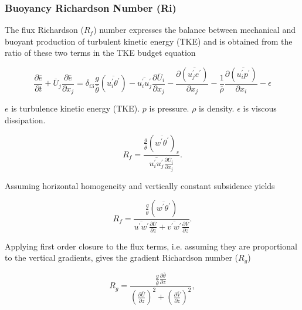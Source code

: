 \subsubsection{Buoyancy Richardson Number (\acs{Ri})}
\label{subsubsec:}

The flux Richardson ($R_{f}$) number expresses the balance between mechanical and buoyant production of turbulent kinetic energy (\acs{TKE}) and is obtained from the ratio of these two terms in the \acs{TKE} budget equation 

\begin{equation}
\frac{\partial \overline{e}}{\partial t} + \overline{U}_{j} \frac{\partial \overline{e}}{\partial x_{j}} = \delta_{i3}  \frac{g}{\overline{\theta}} \left( \overline{u_{i}^{'}\theta^{'}} \right) - \overline{u_{i}^{'}u_{j}^{'}}\frac{\partial \overline{U}_{i}}{\partial x_{j}} - \frac{ \partial \left( \overline{u_{j}^{'}e^{'}} \right)}{\partial x_{j}} - \frac{1}{\overline{\rho}} \frac{\partial \left( \overline{u_{i}^{'} p^{'}} \right) }{\partial x_{i}} - \epsilon
\end{equation}

$e$ is turbulence kinetic energy (TKE).  $p$ is pressure.  $\rho$ is density.  $\epsilon$ is viscous dissipation.

\begin{equation}
R_{f} = \frac{\frac{g}{\overline{\theta}}( \overline{w^{'}\theta^{'}})_{s}}{\overline{u_{i}^{'}u_{j}^{'}}\frac{\partial \overline{U}_{i}}{\partial x_{j}}}.
\end{equation}
 
Assuming horizontal homogeneity and vertically constant subsidence yields
  
\begin{equation}
R_{f} = \frac{\frac{g}{\overline{\theta}} \left( \overline{w^{'}\theta^{'}} \right)}{\overline{u^{'}w^{'}}\frac{\partial \overline{U}}{\partial z} + \overline{v^{'}w^{'}}\frac{\partial \overline{V}}{\partial z}}.
\end{equation}

Applying first order closure to the flux terms, i.e. assuming they are proportional to the vertical gradients, gives the gradient Richardson number ($R_{g}$)

\begin{equation}
R_{g} = \frac{ \frac{g}{\overline{\theta}} \frac{\partial \overline{\theta}}{\partial z}}{\left( \frac{ \partial \overline{U}}{\partial z} \right)^{2} + \left( \frac{\partial \overline{V}}{\partial z} \right)^{2}}, 
\end{equation}

